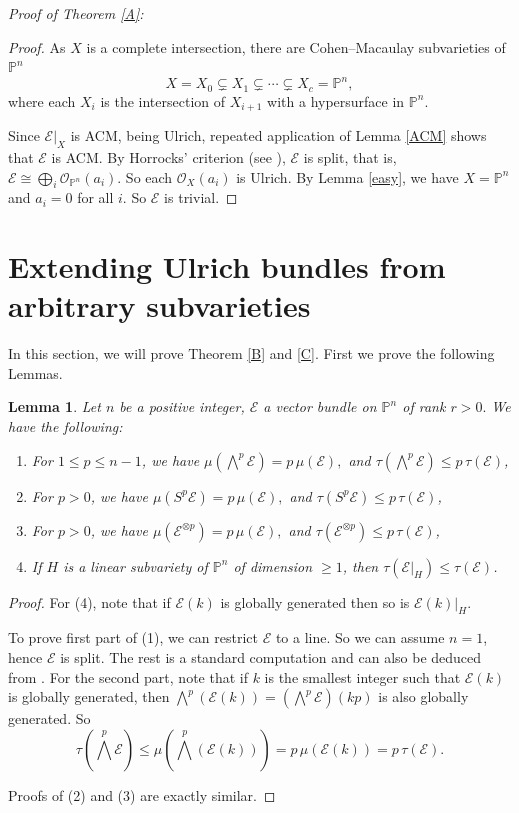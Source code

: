 \documentclass[11pt,letterpaper]{amsart}
\newtheorem{lemma}{Lemma}[section]
\begin{document}
\textit{Proof of Theorem \ref{A}:}
\begin{proof}
    As $X$ is a complete intersection, there are Cohen--Macaulay
subvarieties of $\mathbb{P}^n$
\[
X=X_0\subsetneq X_1\subsetneq \cdots \subsetneq X_c=\mathbb{P}^n,
\]
where each $X_i$ is the intersection of $X_{i+1}$ with a hypersurface
in $\mathbb{P}^n$.

Since $\mathcal{E}|_X$ is ACM, being Ulrich, repeated application of Lemma \ref{ACM} shows that $\mathcal{E}$ is ACM.
By Horrocks' criterion (see \cite[Section 2.3]{okonek1980vector}), $\mathcal{E}$ is split, that is, $\mathcal{E}\cong \bigoplus_i \mathcal{O}_{\mathbb{P}^n}(a_i).$
So each $\mathcal{O}_X(a_i)$ is Ulrich. By Lemma \ref{easy}, we have $X=\mathbb{P}^n$ and $a_i=0$ for all $i$. So $\mathcal{E}$ is trivial.
\end{proof}
\section{Extending Ulrich bundles from arbitrary subvarieties}
In this section, we will prove Theorem \ref{B} and \ref{C}. First we prove the following Lemmas.
\begin{lemma}\label{tau}
Let $n$ be a positive integer, $\mathcal E$ a vector bundle on
$\mathbb P^n$ of rank $r>0.$ We have the following:

\begin{enumerate}
\item For $1\le p\le n-1$, we have $
\mu\!\left(\bigwedge^p\mathcal E\right)
=
p\,\mu(\mathcal E),$
and $
\tau\!\left(\bigwedge^p\mathcal E\right)
\le
p\,\tau(\mathcal E)$,


\item For $p>0$,
we have $
\mu\!\left(S^p\mathcal E\right)
=
p\,\mu(\mathcal E),$
and $
\tau\!\left(S^p\mathcal E\right)
\le
p\,\tau(\mathcal E)$,
\item For $p>0$,
we have $
\mu\!\left(\mathcal E^{\otimes p}\right)
=
p\,\mu(\mathcal E),$
and $
\tau\!\left(\mathcal E^{\otimes p}\right)
\le
p\,\tau(\mathcal E)$,


\item If $H$ is a linear subvariety of $\mathbb{P}^n$ of dimension $\geq 1$, then $\tau(\mathcal E|_H)\leq \tau(\mathcal E)$.
\end{enumerate}
\end{lemma}
\begin{proof}
  For (4), note that if $\mathcal E(k)$ is globally generated then so is $\mathcal E(k)|_H$.

To prove first part of (1), we can restrict $\mathcal{E}$ to a line. So we can assume $n=1$, hence $\mathcal E$ is split. The rest is a
standard computation and can also be deduced from
\cite[Lemma 2.1]{ghosh2026kov}.
For the second part, note that if $k$ is the smallest integer such that
$\mathcal E(k)$ is globally generated, then $\bigwedge^p(\mathcal E(k))
=
(\bigwedge^p\mathcal E)(kp)$
is also globally generated. So
\[
\tau\!\left(\bigwedge^p\mathcal E\right)
\le
\mu\!\left(\bigwedge^p(\mathcal E(k))\right)
=
p\,\mu(\mathcal E(k))
=
p\,\tau(\mathcal E).
\]

Proofs of (2) and (3) are exactly similar.
\end{proof}
\end{document}
